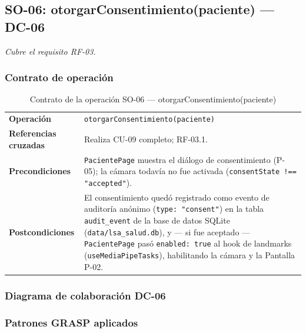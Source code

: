 \subsection{SO-06: otorgarConsentimiento(paciente) --- DC-06}
\textit{Cubre el requisito RF-03.}

\subsubsection{Contrato de operación}

\begin{table}[H]
\centering
\begin{tabularx}{\textwidth}{@{}p{4.4cm} X@{}}
\toprule
\textbf{Operación} & \texttt{otorgarConsentimiento(paciente)} \\
\textbf{Referencias cruzadas} & Realiza CU-09 completo; RF-03.1. \\
\textbf{Precondiciones} & \texttt{PacientePage} muestra el diálogo de
consentimiento (P-05); la cámara todavía no fue activada
(\texttt{consentState !== "accepted"}). \\
\textbf{Postcondiciones} & El consentimiento quedó registrado como evento
de auditoría anónimo (\texttt{type: "consent"}) en la tabla
\texttt{audit\_event} de la base de datos SQLite
(\texttt{data/lsa\_salud.db}), y --- si fue aceptado --- \texttt{PacientePage}
pasó \texttt{enabled: true} al hook de landmarks (\texttt{useMediaPipeTasks}),
habilitando la cámara y la Pantalla P-02. \\
\bottomrule
\end{tabularx}
\caption{Contrato de la operación SO-06 --- otorgarConsentimiento(paciente)}
\label{tab:col-contrato-so06}
\end{table}

\subsubsection{Diagrama de colaboración DC-06}


\subsubsection{Patrones GRASP aplicados}

